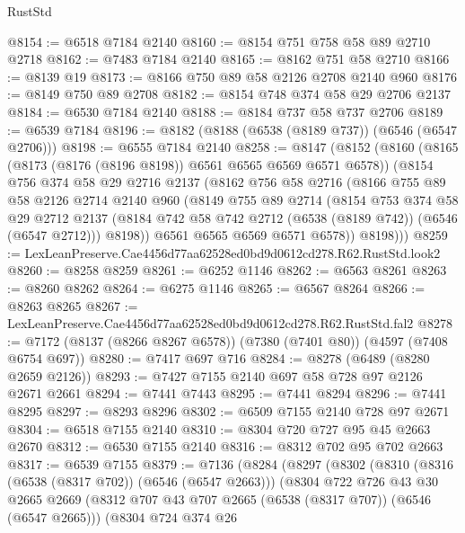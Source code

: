 \begin{lexlean}{RustStd}
\begin{coremodule}
@8154 := @6518 @7184 @2140
@8160 := @8154 @751 @758 @58 @89 @2710 @2718
@8162 := @7483 @7184 @2140
@8165 := @8162 @751 @58 @2710
@8166 := @8139 @19
@8173 := @8166 @750 @89 @58 @2126 @2708 @2140 @960
@8176 := @8149 @750 @89 @2708
@8182 := @8154 @748 @374 @58 @29 @2706 @2137
@8184 := @6530 @7184 @2140
@8188 := @8184 @737 @58 @737 @2706
@8189 := @6539 @7184
@8196 := @8182 (@8188 (@6538 (@8189 @737)) (@6546 (@6547 @2706)))
@8198 := @6555 @7184 @2140
@8258 := @8147
    (@8152
      (@8160
        (@8165 (@8173 (@8176 (@8196 @8198)) @6561 @6565 @6569 @6571 @6578))
        (@8154
          @756
          @374
          @58
          @29
          @2716
          @2137
          (@8162
            @756
            @58
            @2716
            (@8166
              @755
              @89
              @58
              @2126
              @2714
              @2140
              @960
              (@8149
                @755
                @89
                @2714
                (@8154
                  @753
                  @374
                  @58
                  @29
                  @2712
                  @2137
                  (@8184 @742 @58 @742 @2712 (@6538 (@8189 @742)) (@6546 (@6547 @2712)))
                  @8198))
              @6561
              @6565
              @6569
              @6571
              @6578))
          @8198)))
@8259 := LexLeanPreserve.Cae4456d77aa62528ed0bd9d0612cd278.R62.RustStd.look2
@8260 := @8258 @8259
@8261 := @6252 @1146
@8262 := @6563 @8261
@8263 := @8260 @8262
@8264 := @6275 @1146
@8265 := @6567 @8264
@8266 := @8263 @8265
@8267 := LexLeanPreserve.Cae4456d77aa62528ed0bd9d0612cd278.R62.RustStd.fal2
@8278 := @7172 (@8137 (@8266 @8267 @6578)) (@7380 (@7401 @80)) (@4597 (@7408 @6754 @697))
@8280 := @7417 @697 @716
@8284 := @8278 (@6489 (@8280 @2659 @2126))
@8293 := @7427 @7155 @2140 @697 @58 @728 @97 @2126 @2671 @2661
@8294 := @7441 @7443
@8295 := @7441 @8294
@8296 := @7441 @8295
@8297 := @8293 @8296
@8302 := @6509 @7155 @2140 @728 @97 @2671
@8304 := @6518 @7155 @2140
@8310 := @8304 @720 @727 @95 @45 @2663 @2670
@8312 := @6530 @7155 @2140
@8316 := @8312 @702 @95 @702 @2663
@8317 := @6539 @7155
@8379 := @7136
    (@8284
      (@8297
        (@8302
          (@8310
            (@8316 (@6538 (@8317 @702)) (@6546 (@6547 @2663)))
            (@8304
              @722
              @726
              @43
              @30
              @2665
              @2669
              (@8312 @707 @43 @707 @2665 (@6538 (@8317 @707)) (@6546 (@6547 @2665)))
              (@8304
                @724
                @374
                @26

\end{coremodule}
\end{lexlean}
